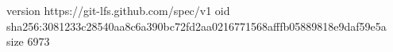 version https://git-lfs.github.com/spec/v1
oid sha256:3081233c28540aa8c6a390bc72fd2aa0216771568afffb05889818e9daf59e5a
size 6973
